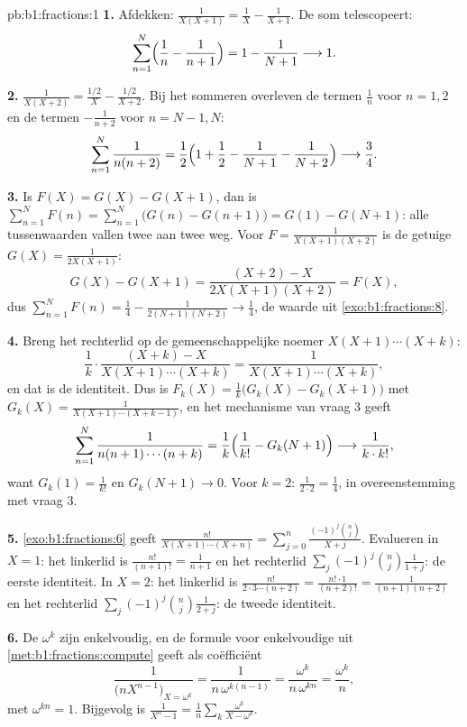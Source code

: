 \begin{solution}{pb:b1:fractions:1}
\textbf{1.} Afdekken: $\frac1{X(X+1)} = \frac1X - \frac1{X+1}$. De som
telescopeert:
\[
\sum_{n=1}^{N}\Bigl(\frac1n - \frac1{n+1}\Bigr)
= 1 - \frac1{N+1} \longrightarrow 1 .
\]

\textbf{2.} $\frac1{X(X+2)} = \frac{1/2}X - \frac{1/2}{X+2}$. Bij het
sommeren overleven de termen $\frac1n$ voor $n = 1, 2$ en de termen
$-\frac1{n+2}$ voor $n = N-1, N$:
\[
\sum_{n=1}^{N}\frac1{n(n+2)}
= \frac12\Bigl(1 + \frac12 - \frac1{N+1} - \frac1{N+2}\Bigr)
\longrightarrow \frac34 .
\]

\textbf{3.} Is $F(X) = G(X) - G(X+1)$, dan is $\sum_{n=1}^N F(n) =
\sum_{n=1}^N\bigl(G(n) - G(n+1)\bigr) = G(1) - G(N+1)$: alle
tussenwaarden vallen twee aan twee weg. Voor $F = \frac1{X(X+1)(X+2)}$ is
de getuige $G(X) = \frac1{2X(X+1)}$:
\[
G(X) - G(X+1)
= \frac{(X+2) - X}{2X(X+1)(X+2)} = F(X) ,
\]
dus $\sum_{n=1}^N F(n) = \frac14 - \frac1{2(N+1)(N+2)} \to \frac14$, de
waarde uit \cref{exo:b1:fractions:8}.

\textbf{4.} Breng het rechterlid op de gemeenschappelijke noemer
$X(X+1)\cdots(X+k)$:
\[
\frac1k\cdot\frac{(X + k) - X}{X(X+1)\cdots(X+k)}
= \frac{1}{X(X+1)\cdots(X+k)} ,
\]
en dat is de identiteit. Dus is $F_k(X) = \frac1k\bigl(G_k(X) -
G_k(X+1)\bigr)$ met $G_k(X) = \frac1{X(X+1)\cdots(X+k-1)}$, en het
mechanisme van vraag 3 geeft
\[
\sum_{n=1}^{N}\frac1{n(n+1)\cdots(n+k)}
= \frac1k\Bigl(\frac1{k!} - G_k(N+1)\Bigr)
\longrightarrow \frac1{k\cdot k!} ,
\]
want $G_k(1) = \frac1{k!}$ en $G_k(N+1) \to 0$. Voor $k = 2$:
$\frac1{2\cdot2} = \frac14$, in overeenstemming met vraag 3.

\textbf{5.} \cref{exo:b1:fractions:6} geeft
$\frac{n!}{X(X+1)\cdots(X+n)} = \sum_{j=0}^n \frac{(-1)^j\binom nj}{X +
j}$. Evalueren in $X = 1$: het linkerlid is $\frac{n!}{(n+1)!} =
\frac1{n+1}$ en het rechterlid $\sum_j(-1)^j\binom nj\frac1{1+j}$: de
eerste identiteit. In $X = 2$: het linkerlid is
$\frac{n!}{2\cdot3\cdots(n+2)} = \frac{n!\cdot1}{(n+2)!} =
\frac1{(n+1)(n+2)}$ en het rechterlid $\sum_j(-1)^j\binom
nj\frac1{2+j}$: de tweede identiteit.

\textbf{6.} De  $\omega^k$ zijn enkelvoudig, en de formule voor
enkelvoudige  uit \cref{met:b1:fractions:compute} geeft als
coëfficiënt
\[
\frac{1}{\bigl(nX^{n-1}\bigr)_{X = \omega^k}}
= \frac{1}{n\,\omega^{k(n-1)}}
= \frac{\omega^k}{n\,\omega^{kn}} = \frac{\omega^k}n ,
\]
met $\omega^{kn} = 1$. Bijgevolg is $\frac1{X^n-1} = \frac1n\sum_k
\frac{\omega^k}{X - \omega^k}$.


\end{solution}
